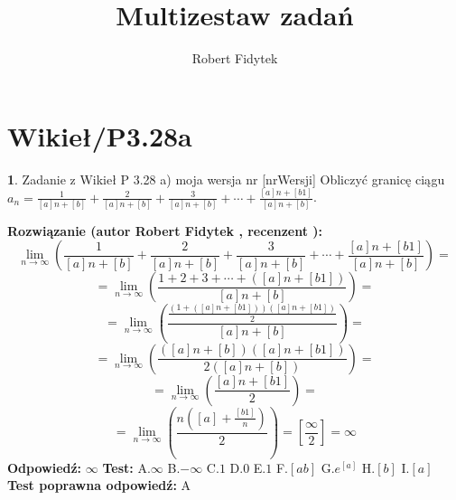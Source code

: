 \documentclass[12pt, a4paper]{article}
\title{Multizestaw zadań}
\author{Robert Fidytek}
\date{}
\theoremstyle{definition} %
\newtheorem{zad}{}
\newcommand{\kategoria}[1]{\section{#1}} %
\newcommand{\zadStart}[1]{\begin{zad}#1\newline} %
\newcommand{\zadStop}{\end{zad}}   %
\newcommand{\rozwStart}[2]{\noindent \textbf{Rozwiązanie (autor #1 , recenzent #2): }\newline} %
\newcommand{\rozwStop}{\newline}                                            %
\newcommand{\odpStart}{\noindent \textbf{Odpowiedź:}\newline}    %
\newcommand{\odpStop}{\newline}                                             %
\newcommand{\testStart}{\noindent \textbf{Test:}\newline} %
\newcommand{\testStop}{\newline} %
\newcommand{\kluczStart}{\noindent \textbf{Test poprawna odpowiedź:}\newline} %
\newcommand{\kluczStop}{\newline} %
\begin{document}
\maketitle


\kategoria{Wikieł/P3.28a}
\zadStart{Zadanie z Wikieł P 3.28 a) moja wersja nr [nrWersji]}
Obliczyć granicę ciągu $a_{n}=\frac{1}{[a]n+[b]}+\frac{2}{[a]n+[b]}+\frac{3}{[a]n+[b]}+\cdots+\frac{[a]n+[b1]}{[a]n+[b]}$.
\zadStop
\rozwStart{Robert Fidytek}{}
$$\lim\limits_{n\to\infty}\left(\frac{1}{[a]n+[b]}+\frac{2}{[a]n+[b]}+\frac{3}{[a]n+[b]}+\cdots+\frac{[a]n+[b1]}{[a]n+[b]}\right)=$$ 
$$=\lim\limits_{n\to\infty}\left(\frac{1+2+3+\cdots+([a]n+[b1])}{[a]n+[b]}\right)=$$ 
$$=\lim\limits_{n\to\infty}\left(\frac{\frac{(1+([a]n+[b1]))([a]n+[b1])}{2}}{[a]n+[b]}\right)=$$ 
$$=\lim\limits_{n\to\infty}\left(\frac{([a]n+[b])([a]n+[b1])}{2([a]n+[b])}\right)=$$ 
$$=\lim\limits_{n\to\infty}\left(\frac{[a]n+[b1]}{2}\right)=$$ 
$$=\lim\limits_{n\to\infty}\left(\frac{n\left([a]+\frac{[b1]}{n}\right)}{2}\right)=\left[\frac{\infty}{2} \right]=\infty$$ 
\rozwStop
\odpStart
$\infty$
\odpStop
\testStart
A.$\infty$
B.$-\infty$
C.$1$
D.$0$
E.$1$
F.$[ab]$
G.$e^{[a]}$
H.$[b]$
I.$[a]$
\testStop
\kluczStart
A
\kluczStop
\end{document}
